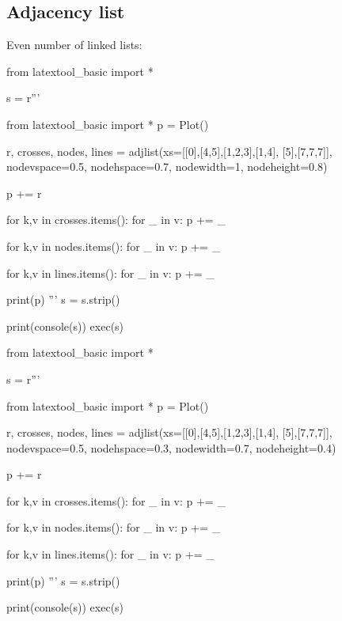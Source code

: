 \subsection{Adjacency list}


Even number of linked lists:

\begin{python}
from latextool_basic import *

s = r'''

from latextool_basic import *
p = Plot()

r, crosses, nodes, lines = adjlist(xs=[[0],[4,5],[1,2,3],[1,4], [5],[7,7,7]],
                                   nodevspace=0.5, nodehspace=0.7,
                                   nodewidth=1, nodeheight=0.8)

p += r

for k,v in crosses.items():
    for _ in v: p += _

for k,v in nodes.items():
    for _ in v: p += _

for k,v in lines.items():
    for _ in v: p += _

print(p)
'''
s = s.strip()

print(console(s))
exec(s)
\end{python}


\begin{python}
from latextool_basic import *

s = r'''

from latextool_basic import *
p = Plot()

r, crosses, nodes, lines = adjlist(xs=[[0],[4,5],[1,2,3],[1,4], [5],[7,7,7]],
                                   nodevspace=0.5, nodehspace=0.3,
                                   nodewidth=0.7, nodeheight=0.4)

p += r

for k,v in crosses.items():
    for _ in v: p += _

for k,v in nodes.items():
    for _ in v: p += _

for k,v in lines.items():
    for _ in v: p += _

print(p)
'''
s = s.strip()

print(console(s))
exec(s)
\end{python}




